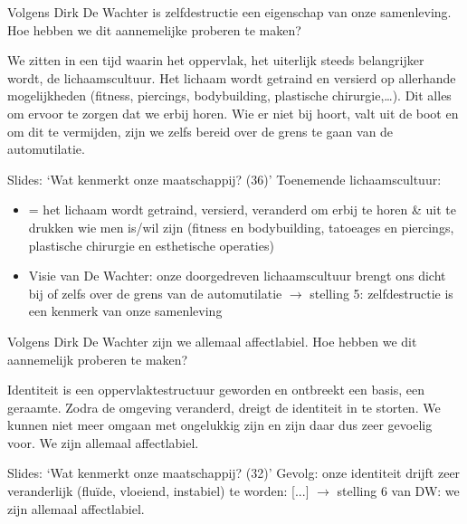 \documentclass[main.tex]{subfiles}
\begin{document}
\begin{examenvraag}
    \begin{vraag}
        Volgens Dirk De Wachter is zelfdestructie een eigenschap van onze samenleving. Hoe hebben we dit aannemelijke proberen te maken?
    \end{vraag}

    \begin{antwoord}
        We zitten in een tijd waarin het oppervlak,‭ ‬het uiterlijk steeds 
        belangrijker wordt,‭ ‬de lichaamscultuur.‭ ‬Het lichaam wordt getraind en 
        versierd op allerhande mogelijkheden‭ (‬fitness,‭ ‬piercings,‭ 
        ‬bodybuilding,‭ ‬plastische chirurgie,‭…‬).‭ ‬Dit alles om ervoor te zorgen 
        dat we erbij horen.‭ ‬Wie er niet bij hoort,‭ ‬valt uit de boot en om dit 
        te vermijden,‭ ‬zijn we zelfs bereid over de grens te gaan van de 
        automutilatie.
        \begin{citaat}{Slides: `Wat kenmerkt onze maatschappij? (36)'}
            Toenemende lichaamscultuur:
            \begin{itemize}
                \item = het lichaam wordt getraind, versierd, veranderd om erbij te horen \& uit te drukken wie men is/wil zijn (fitness en bodybuilding, tatoeages en piercings, plastische chirurgie en esthetische operaties)
                \item Visie van De Wachter: onze doorgedreven lichaamscultuur brengt ons dicht bij of zelfs over de grens van de automutilatie $\rightarrow$ stelling 5: zelfdestructie is een kenmerk van onze samenleving
            \end{itemize}
        \end{citaat}
    \end{antwoord}
\end{examenvraag}


\begin{examenvraag}
    \begin{vraag}
        Volgens Dirk De Wachter zijn we allemaal affectlabiel. Hoe hebben we dit aannemelijk proberen te maken?
    \end{vraag}

    \begin{antwoord}
        Identiteit is een oppervlaktestructuur geworden en ontbreekt een basis, een geraamte. Zodra de omgeving veranderd, dreigt de identiteit in te storten. We kunnen niet meer omgaan met ongelukkig zijn en zijn daar dus zeer gevoelig voor.
        We zijn allemaal affectlabiel.
        \begin{citaat}{Slides: `Wat kenmerkt onze maatschappij? (32)'}
            Gevolg: onze identiteit drijft zeer veranderlijk (flu\"ide, vloeiend, instabiel) te worden:
            [...]
            $\rightarrow$ stelling 6 van DW: we zijn allemaal affectlabiel.
        \end{citaat}
    \end{antwoord}
\end{examenvraag}
\end{document}
